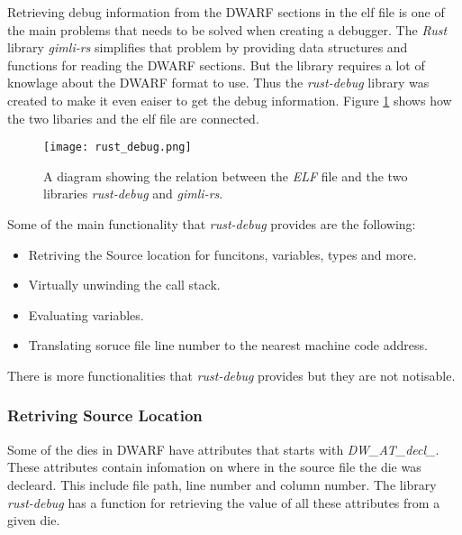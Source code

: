 
Retrieving debug information from the \gls{DWARF} sections in the \gls{elf} file is one of the main problems that needs to be solved when creating a debugger.
The \emph{Rust} library \emph{gimli-rs} simplifies that problem by providing data structures and functions for reading the \gls{DWARF} sections.
But the library requires a lot of knowlage about the \gls{DWARF} format to use.
Thus the \emph{rust-debug} library was created to make it even eaiser to get the debug information.
Figure \ref{fig:rustdebug} shows how the two libaries and the \gls{elf} file are connected.


\begin{figure}[h]
	\centering
	\texttt{[image: rust\_debug.png]}
	\caption{A diagram showing the relation between the \emph{ELF} file and the two libraries \emph{rust-debug} and \emph{gimli-rs}.}
	\label{fig:rustdebug}
\end{figure}


Some of the main functionality that \emph{rust-debug} provides are the following:

\begin{itemize}
  \item Retriving the Source location for funcitons, variables, types and more.
  \item Virtually unwinding the call stack.
  \item Evaluating variables.
  \item Translating soruce file line number to the nearest machine code address.
\end{itemize}

There is more functionalities that \emph{rust-debug} provides but they are not notisable.



\subsubsection{Retriving Source Location}
Some of the \glspl{die} in \gls{DWARF} have attributes that starts with \emph{DW\_AT\_decl\_}.
These attributes contain infomation on where in the source file the \gls{die} was decleard.
This include file path, line number and column number.
The library \emph{rust-debug} has a function for retrieving the value of all these attributes from a given \gls{die}.


